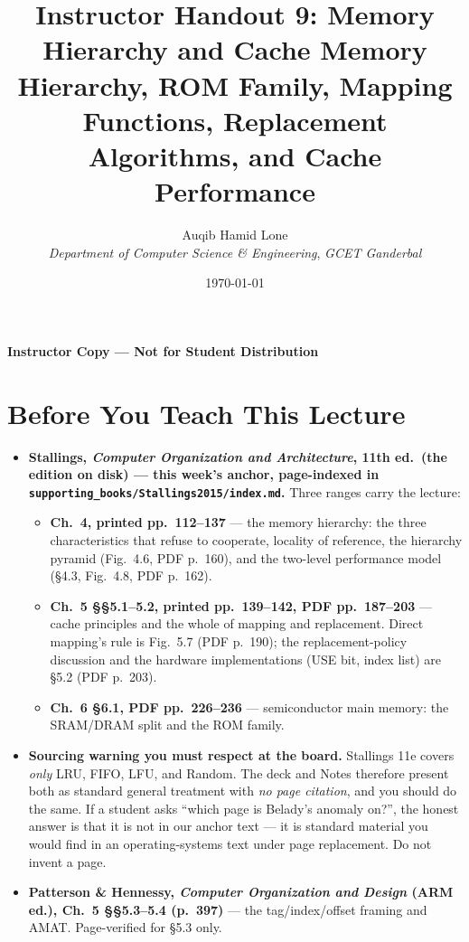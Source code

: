 \documentclass[11pt]{article}
\title{Instructor Handout 9: Memory Hierarchy and Cache Memory\\\large
  Hierarchy, ROM Family, Mapping Functions, Replacement Algorithms, and Cache Performance}
\author{Auqib Hamid Lone\\[0.3em]
  \emph{Department of Computer Science \& Engineering}, \emph{GCET Ganderbal}}
\date{\today}
\begin{document}
\maketitle
{\centering\large\color{negative}\textbf{Instructor Copy --- Not for Student Distribution}\par}
\vspace{0.5cm}

\section{Before You Teach This Lecture}

\begin{sloppypar}
\begin{itemize}
  \item \textbf{Stallings, \textit{Computer Organization and Architecture}, 11th ed.\ (the edition on disk) --- this week's anchor, page-indexed in \texttt{supporting\_books/Stallings2015/index.md}.} Three ranges carry the lecture:
    \begin{itemize}
      \item \textbf{Ch.~4, printed pp.~112--137} --- the memory hierarchy: the three characteristics that refuse to cooperate, locality of reference, the hierarchy pyramid (Fig.~4.6, PDF p.~160), and the two-level performance model (\S4.3, Fig.~4.8, PDF p.~162).
      \item \textbf{Ch.~5 \S\S5.1--5.2, printed pp.~139--142, PDF pp.~187--203} --- cache principles and the whole of mapping and replacement. Direct mapping's rule is Fig.~5.7 (PDF p.~190); the replacement-policy discussion and the hardware implementations (USE bit, index list) are \S5.2 (PDF p.~203).
      \item \textbf{Ch.~6 \S6.1, PDF pp.~226--236} --- semiconductor main memory: the SRAM/DRAM split and the ROM family.
    \end{itemize}
  \item \textbf{Sourcing warning you must respect at the board.} Stallings 11e covers \emph{only} LRU, FIFO, LFU, and Random.  The deck and Notes therefore present both as standard general treatment with \emph{no page citation}, and you should do the same. If a student asks ``which page is Belady's anomaly on?'', the honest answer is that it is not in our anchor text --- it is standard material you would find in an operating-systems text under page replacement. Do not invent a page.
  \item \textbf{Patterson \& Hennessy, \textit{Computer Organization and Design} (ARM ed.), Ch.~5 \S\S5.3--5.4 (p.~397)} --- the tag/index/offset framing and AMAT. Page-verified for \S5.3 only.

\end{itemize}
\end{sloppypar}
\end{document}
